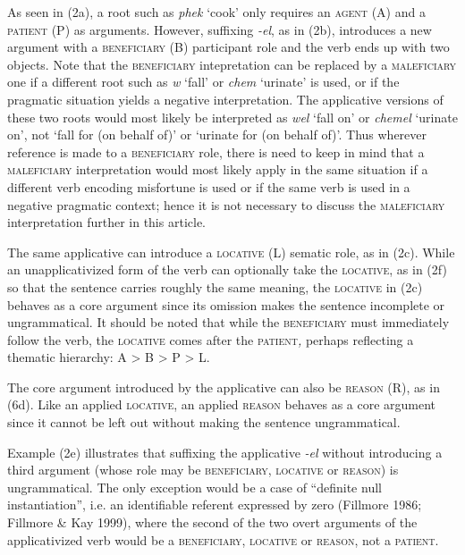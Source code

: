 \documentclass[output=paper]{langsci/langscibook}
\begin{document}
As seen in (2a), a root such as \textit{phek} ‘cook’ only requires an \textsc{agent} (A) and a \textsc{patient} (P) as arguments. However, suffixing \textit{-el}, as in (2b), introduces a new argument with a \textsc{beneficiary} (B) participant role and the verb ends up with two objects. Note that the \textsc{beneficiary} intepretation can be replaced by a \textsc{maleficiary} one if a different root such as \textit{w} ‘fall’ or \textit{chem} ‘urinate’ is used, or if the pragmatic situation yields a negative interpretation. The applicative versions of these two roots would most likely be interpreted as \textit{wel} ‘fall on’ or \textit{chemel} ‘urinate on’, not ‘fall for (on behalf of)’ or ‘urinate for (on behalf of)’. Thus wherever reference is made to a \textsc{beneficiary} role, there is need to keep in mind that a \textsc{maleficiary} interpretation would most likely apply in the same situation if a different verb encoding misfortune is used or if the same verb is used in a negative pragmatic context; hence it is not necessary to discuss the \textsc{maleficiary} interpretation further in this article. 

 The same applicative can introduce a \textsc{locative} (L) sematic role, as in (2c). While an unapplicativized form of the verb can optionally take the \textsc{locative}, as in (2f) so that the sentence carries roughly the same meaning, the \textsc{locative} in (2c) behaves as a core argument since its omission makes the sentence incomplete or ungrammatical. It should be noted that while the \textsc{beneficiary} must immediately follow the verb, the \textsc{locative} comes after the \textsc{patient}\textit{,} perhaps reflecting a thematic hierarchy: A > B > P > L. 

 The core argument introduced by the applicative can also be \textsc{reason} (R), as in (6d). Like an applied \textsc{locative}, an applied \textsc{reason} behaves as a core argument since it cannot be left out without making the sentence ungrammatical. 

 Example (2e) illustrates that suffixing the applicative \textit{-el} without introducing a third argument (whose role may be \textsc{beneficiary}, \textsc{locative} or \textsc{reason}) is ungrammatical. The only exception would be a case of “definite null instantiation”, i.e. an identifiable referent expressed by zero (Fillmore 1986; Fillmore \& Kay 1999), where the second of the two overt arguments of the applicativized verb would be a \textsc{beneficiary}, \textsc{locative} or \textsc{reason}, not a \textsc{patient}.
\end{document}

